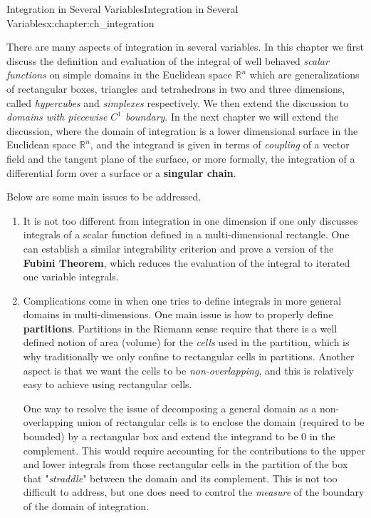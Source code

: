 \documentclass[oneside,10pt,]{book}
\newcommand{\terminology}[1]{\textbf{#1}}
\newcommand{\bbR}{\mathbb R}
\begin{document}
\raggedbottom
%
%
\typeout{************************************************}
\typeout{************************************************}
%
\begin{chapterptx}{Integration in Several Variables}{}{Integration in Several Variables}{}{}{x:chapter:ch_integration}
\begin{introduction}{}%
There are many aspects of integration in several variables. In this chapter we  first discuss the definition and evaluation of the integral of well behaved \emph{scalar functions}  on simple domains in the Euclidean space \(\bbR^{n}\) which are generalizations of rectangular boxes, triangles and tetrahedrons in two and three dimensions, called \emph{hypercubes} and \emph{simplexes} respectively. We then extend the discussion to \emph{domains with piecewise \(C^{1}\) boundary}. In the next chapter we will extend the discussion, where the domain of integration is a lower dimensional surface in the Euclidean space \(\bbR^{n}\), and the integrand is given in terms of \emph{coupling} of a vector field and the tangent plane of the surface, or more formally, the integration of a differential form over a surface or a \terminology{singular chain}.%
\par
Below are some main issues to be addressed.%
%
\begin{enumerate}
\item{}It is not too different from integration in one dimension if one only discusses integrals of a scalar function defined in a multi-dimensional rectangle. One can establish a similar integrability criterion and prove a version of the \terminology{Fubini Theorem}, which reduces the evaluation of the integral to iterated one variable integrals.%
\item{}Complications come in when one tries to define integrals in more general domains in multi-dimensions. One main issue is how to properly define \terminology{partitions}. Partitions in the Riemann sense require that there is a well defined notion of area (volume) for the \emph{cells} used in the partition, which is why traditionally we only confine to rectangular cells in partitions. Another aspect is that we want the cells to be \emph{non-overlapping}, and this is relatively easy to achieve using rectangular cells.%
\par
One way to resolve the issue of decomposing a general domain as a non-overlapping union of rectangular cells is to enclose the domain (required to be bounded) by a rectangular box and extend the integrand to be \(0\) in the complement. This would require accounting for the contributions to the upper and lower integrals from  those rectangular cells in the partition of the box that "\emph{straddle}" between the domain and its complement. This is not too difficult to address, but one does need to control the \emph{measure} of the boundary of the domain of integration.%

\end{enumerate}
\end{introduction}
\end{chapterptx}
\end{document}
